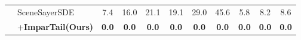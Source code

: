 \begin{table}[!h]
{\begin{tabular}{l|l|ccccccccc}
          \cmidrule(lr){3-11} 
        &        SceneSayerSDE~\cite{peddi_et_al_scene_sayer_2024} & 7.4 & 16.0 & 21.1 & 19.1 & 29.0 & 45.6 & 5.8 & 8.2 & 8.6  \\ 
        &        \quad+\textbf{ImparTail(Ours)} & \cellcolor{highlightColor} \textbf{0.0} & \cellcolor{highlightColor} \textbf{0.0} & \cellcolor{highlightColor} \textbf{0.0} & \cellcolor{highlightColor} \textbf{0.0} & \cellcolor{highlightColor} \textbf{0.0} & \cellcolor{highlightColor} \textbf{0.0} & \cellcolor{highlightColor} \textbf{0.0} & \cellcolor{highlightColor} \textbf{0.0} & \cellcolor{highlightColor} \textbf{0.0}  \\ 
          \cmidrule(lr){3-11} 
    \end{tabular}
    }
\end{table}
